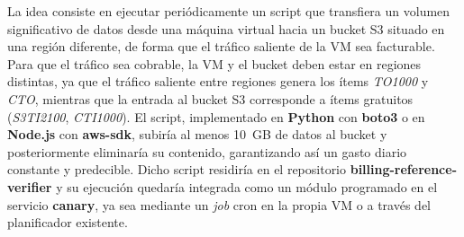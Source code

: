 La idea consiste en ejecutar periódicamente un script que transfiera un volumen significativo de datos desde una máquina virtual hacia un bucket S3 situado en una región diferente, de forma que el tráfico saliente de la VM sea facturable. Para que el tráfico sea cobrable, la VM y el bucket deben estar en regiones distintas, ya que el tráfico saliente entre regiones genera los ítems \textit{TO1000} y \textit{CTO}, mientras que la entrada al bucket S3 corresponde a ítems gratuitos (\textit{S3TI2100}, \textit{CTI1000}). El script, implementado en \textbf{Python} con \textbf{boto3} o en \textbf{Node.js} con \textbf{aws-sdk}, subiría al menos 10~GB de datos al bucket y posteriormente eliminaría su contenido, garantizando así un gasto diario constante y predecible. Dicho script residiría en el repositorio \textbf{billing-reference-verifier} y su ejecución quedaría integrada como un módulo programado en el servicio \textbf{canary}, ya sea mediante un \textit{job} cron en la propia VM o a través del planificador existente. 